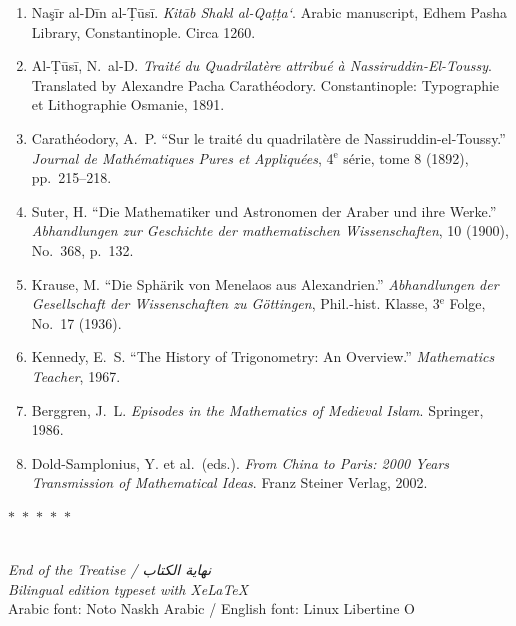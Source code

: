 \documentclass[11pt,a4paper]{article}
\theoremstyle{plain}
\theoremstyle{definition}
\theoremstyle{remark}
\newcommand{\ar}[1]{{\arabicfont\beginR #1\endR}}
\newcommand{\dblornament}{\begin{center}\textcolor{goldaccent}{$\ast$~$\ast$~$\ast$~$\ast$~$\ast$}\end{center}}
\begin{document}
\begin{enumerate}
\item Na\c{s}\=ir al-D\=in al-\d{T}\=us\=i. \textit{Kit\=ab Shakl al-Qa\d{t}\d{t}a`}. Arabic manuscript, Edhem Pasha Library, Constantinople. Circa 1260.

\item Al-\d{T}\=us\=i, N.~al-D. \textit{Trait\'e du Quadrilat\`ere attribu\'e \`a Nassiruddin-El-Toussy}. Translated by Alexandre Pacha Carath\'eodory. Constantinople: Typographie et Lithographie Osmanie, 1891.

\item Carath\'eodory, A.~P. ``Sur le trait\'e du quadrilat\`ere de Nassiruddin-el-Toussy.'' \textit{Journal de Math\'ematiques Pures et Appliqu\'ees}, 4$^{\text{e}}$ s\'erie, tome 8 (1892), pp.~215--218.

\item Suter, H. ``Die Mathematiker und Astronomen der Araber und ihre Werke.'' \textit{Abhandlungen zur Geschichte der mathematischen Wissenschaften}, 10 (1900), No.~368, p.~132.

\item Krause, M. ``Die Sph\"arik von Menelaos aus Alexandrien.'' \textit{Abhandlungen der Gesellschaft der Wissenschaften zu G\"ottingen}, Phil.-hist. Klasse, 3$^{\text{e}}$ Folge, No.~17 (1936).

\item Kennedy, E.~S. ``The History of Trigonometry: An Overview.'' \textit{Mathematics Teacher}, 1967.

\item Berggren, J.~L. \textit{Episodes in the Mathematics of Medieval Islam}. Springer, 1986.

\item Dold-Samplonius, Y. et al.~(eds.). \textit{From China to Paris: 2000 Years Transmission of Mathematical Ideas}. Franz Steiner Verlag, 2002.
\end{enumerate}

\vspace{1cm}
\begin{center}
\dblornament\\[0.5cm]
{\small\textit{End of the Treatise / \ar{نهاية الكتاب}}}\\[0.3cm]
{\small\textit{Bilingual edition typeset with XeLaTeX}}\\[0.3cm]
{\small Arabic font: Noto Naskh Arabic / English font: Linux Libertine O}
\end{center}
\end{document}

